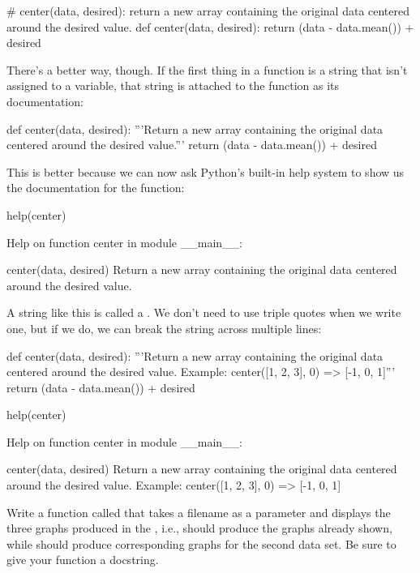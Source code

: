 \begin{VerbIn}
# center(data, desired): return a new array containing the original data centered around the desired value.
def center(data, desired):
    return (data - data.mean()) + desired
\end{VerbIn}

There's a better way, though. If the first thing in a function is a
string that isn't assigned to a variable, that string is attached to the
function as its documentation:

\begin{VerbIn}
def center(data, desired):
    '''Return a new array containing the original data centered around the desired value.'''
    return (data - data.mean()) + desired
\end{VerbIn}

This is better because we can now ask Python's built-in help system to
show us the documentation for the function:

\begin{VerbIn}
help(center)
\end{VerbIn}

\begin{VerbOut}
Help on function center in module __main__:

center(data, desired)
    Return a new array containing the original data centered around the desired value.
\end{VerbOut}

A string like this is called a . We
don't need to use triple quotes when we write one, but if we do, we can
break the string across multiple lines:

\begin{VerbIn}
def center(data, desired):
    '''Return a new array containing the original data centered around the desired value.
    Example: center([1, 2, 3], 0) => [-1, 0, 1]'''
    return (data - data.mean()) + desired

help(center)
\end{VerbIn}

\begin{VerbOut}
Help on function center in module __main__:

center(data, desired)
    Return a new array containing the original data centered around the desired value.
    Example: center([1, 2, 3], 0) => [-1, 0, 1]
\end{VerbOut}

\begin{challenge}
  Write a function called  that takes a filename as a
  parameter and displays the three graphs produced in the
  , i.e.,
   should produce the graphs
  already shown, while  should
  produce corresponding graphs for the second data set. Be sure to give
  your function a docstring.
\end{challenge}

